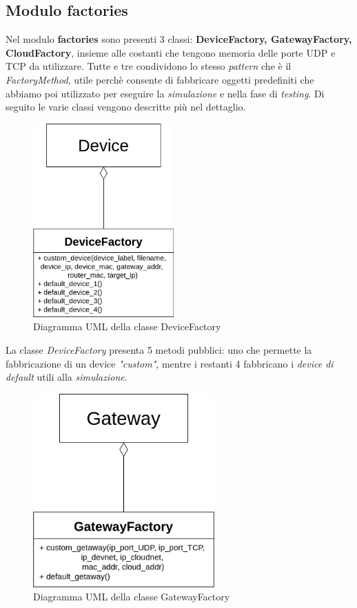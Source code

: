 \documentclass[a4paper,12pt]{report}
\begin{document}
\subsection{Modulo factories}
Nel modulo \textbf{factories} sono presenti 3 classi: \textbf{DeviceFactory, GatewayFactory, CloudFactory}, insieme alle costanti che tengono memoria delle porte UDP e TCP da utilizzare.
%
Tutte e tre condividono lo stesso \emph{pattern} che è il \emph{FactoryMethod}, utile perchè consente di fabbricare oggetti predefiniti che abbiamo poi utilizzato per eseguire la \emph{simulazione} e nella fase di \emph{testing}. Di seguito le varie classi vengono descritte più nel dettaglio.

\begin{figure}[H]
    \centering{}
    \includegraphics[width=.4\textwidth,height=20em]{img/UML_Device_Factory.png}
    \caption{Diagramma UML della classe DeviceFactory}
    \label{img:uml_devicefactory}
\end{figure}

La classe \emph{DeviceFactory} presenta 5 metodi pubblici: uno che permette la fabbricazione di un device \emph{"custom"}, mentre i restanti 4 fabbricano i \emph{device di default} utili alla \emph{simulazione}.

\begin{figure}[H]
    \centering{}
    \includegraphics[width=.4\textwidth,height=20em]{img/UML_GatewayFactory.png}
    \caption{Diagramma UML della classe GatewayFactory}
    \label{img:uml_gatewayfactory}
\end{figure}
\end{document}
